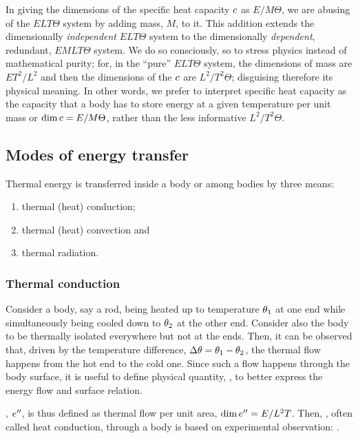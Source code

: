 \begin{technote}
In giving the dimensions of the specific heat capacity $c$ as $E/M\Theta$, we are abusing of the $ELT\Theta$ system by adding mass, $M$, to it. This addition extends the dimensionally \emph{independent} $ELT\Theta$ system to the dimensionally \emph{dependent}, redundant, $EMLT\Theta$ system. We do so consciously, so to stress physics instead of mathematical purity; for, in the ``pure'' $ELT\Theta$ system, the dimensions of mass are $ET^2/L^2$ and then the dimensions of the $c$ are $L^2/T^2\Theta$; disguising therefore its physical meaning. In other words, we prefer to interpret specific heat capacity as the capacity that a body has to store energy at a given temperature per unit mass or $\dim c = E/M\Theta$, rather than the less informative $L^2/T^2\Theta$.
\end{technote}


\subsection{Modes of energy transfer}
Thermal energy is transferred inside a body or among bodies by three means:
\begin{enumerate}
\item thermal (heat) conduction;
\item thermal (heat) convection and
\item thermal radiation.
\end{enumerate}


\subsubsection{Thermal conduction}
Consider a body, say a rod, being heated up to temperature $\theta_1$ at one end while simultaneously being cooled down to $\theta_2$ at the other end. Consider also the body to be thermally isolated everywhere but not at the ends. Then, it can be observed that, driven by the temperature difference, $\Delta\theta = \theta_1 - \theta_2$, the thermal flow happens from the hot end to the cold one. Since such a flow happens through the body surface, it is useful to define physical quantity, , to better express the energy flow and surface relation.

, ${e}^{\prime\prime}$, is thus defined as thermal flow per unit area, $\dim{e}^{\prime\prime} = E/L^2T$. Then, , often called heat conduction, through a body is based on experimental observation: . 

